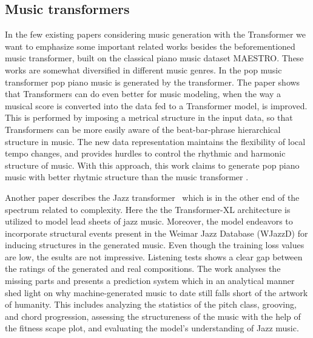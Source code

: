 \documentclass{IEEEtran}
\begin{document}
       \subsection{Music transformers}
       In the few existing papers considering music generation with the Transformer
       we want to emphasize some important related works besides the beforementioned
       music transformer, built on the classical piano music dataset MAESTRO.
       These works are somewhat diversified in different music genres. In the pop
       music transformer \cite{huang2020pop} pop piano music is generated by the
       transformer. The paper shows that Transformers can do even better for music
       modeling, when the way a musical score is converted into the data fed to a
       Transformer model, is improved. This is performed by imposing a metrical structure
       in the input data, so that Transformers can be more easily aware of the
       beat-bar-phrase hierarchical structure in music. The new data representation
       maintains the flexibility of local tempo changes, and provides hurdles to control
       the rhythmic and harmonic structure of music. With this approach, this work
       claims to generate pop piano music with better rhytmic structure than the music
       transformer \cite{huang2018music}.

       Another paper describes the Jazz transformer~\cite{wu2020jazz} which is in the
       other end of the spectrum related to complexity. Here the the Transformer-XL
       architecture is utilized to model lead sheets of jazz music. Moreover, the model
       endeavors to incorporate structural events present in the Weimar Jazz Database
       (WJazzD) for inducing structures in the generated music. Even though the training
       loss values are low, the esults are not impressive. Listening tests shows a clear
       gap between the ratings of the generated and real compositions. The work analyses
       the missing parts and presents a prediction system which in an analytical manner
       shed light on why machine-generated music to date still falls short of the artwork
       of humanity. This includes analyzing the statistics of
       the pitch class, grooving, and chord progression, assessing the structureness of
       the music with the help of the fitness scape plot, and evaluating the model’s
       understanding of Jazz music.
\end{document}
